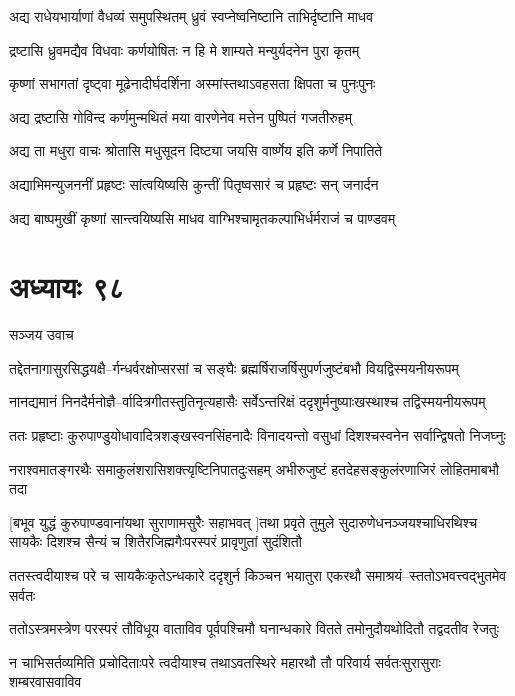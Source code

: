 \twolineshloka
{अद्य राधेयभार्याणां वैधव्यं समुपस्थितम्}
{ध्रुवं स्वप्नेष्वनिष्टानि ताभिर्दृष्टानि माधव}


\twolineshloka
{द्रष्टासि ध्रुवमद्यैव विधवाः कर्णयोषितः}
{न हि मे शाम्यते मन्युर्यदनेन पुरा कृतम्}


\twolineshloka
{कृष्णां सभागतां दृष्ट्वा मूढेनादीर्घदर्शिना}
{अस्मांस्तथाऽवहसता क्षिपता च पुनःपुनः}


\twolineshloka
{अद्य द्रष्टासि गोविन्द कर्णमुन्मथितं मया}
{वारणेनेव मत्तेन पुष्पितं गजतीरुहम्}


\twolineshloka
{अद्य ता मधुरा वाचः श्रोतासि मधुसूदन}
{दिष्ट्या जयसि वार्ष्णेय इति कर्णे निपातिते}


\twolineshloka
{अद्याभिमन्युजननीं प्रहृष्टः सांत्वयिष्यसि}
{कुन्तीं पितृष्वसारं च प्रहृष्टः सन् जनार्दन}


\twolineshloka
{अद्य बाष्पमुखीं कृष्णां सान्त्वयिष्यसि माधव}
{वाग्भिश्चामृतकल्पाभिर्धर्मराजं च पाण्डवम्}


\chapter{अध्यायः ९८}
\twolineshloka
{सञ्जय उवाच}
{}


\twolineshloka
{तद्देतनागासुरसिद्धयक्षै--र्गन्धर्वरक्षोप्सरसां च सङ्घैः}
{ब्रह्मर्षिराजर्षिसुपर्णजुष्टंबभौ वियद्विस्मयनीयरूपम्}


\twolineshloka
{नानद्यमानं निनदैर्मनोज्ञै--र्वादित्रगीतस्तुतिनृत्यहासैः}
{सर्वेऽन्तरिक्षं ददृशुर्मनुष्याःखस्थाश्च तद्विस्मयनीयरूपम्}


\twolineshloka
{ततः प्रहृष्टाः कुरुपाण्डुयोधावादित्रशङ्खस्वनसिंहनादैः}
{विनादयन्तो वसुधां दिशश्चस्वनेन सर्वान्द्विषतो निजघ्नुः}


\twolineshloka
{नराश्वमातङ्गरथैः समाकुलंशरासिशक्त्यृष्टिनिपातदुःसहम्}
{अभीरुजुष्टं हतदेहसङ्कुलंरणाजिरं लोहितमाबभौ तदा}


\threelineshloka
{[बभूव युद्धं कुरुपाण्डवानांयथा सुराणामसुरैः सहाभवत्}
{]तथा प्रवृते तुमुले सुदारुणेधनञ्जयश्चाधिरथिश्च सायकैः}
{दिशश्च सैन्यं च शितैरजिह्मगैःपरस्परं प्रावृणुतां सुदंशितौ}


\twolineshloka
{ततस्त्वदीयाश्च परे च सायकैःकृतेऽन्धकारे ददृशुर्न किञ्चन}
{भयातुरा एकरथौ समाश्रयं--स्ततोऽभवत्त्वद्भुतमेव सर्वतः}


\twolineshloka
{ततोऽस्त्रमस्त्रेण परस्परं तौविधूय वाताविव पूर्वपश्चिमौ}
{घनान्धकारे वितते तमोनुदौयथोदितौ तद्वदतीव रेजतुः}


\twolineshloka
{न चाभिसर्तव्यमिति प्रचोदिताःपरे त्वदीयाश्च तथाऽवतस्थिरे}
{महारथौ तौ परिवार्य सर्वतःसुरासुराः शम्बरवासवाविव}


